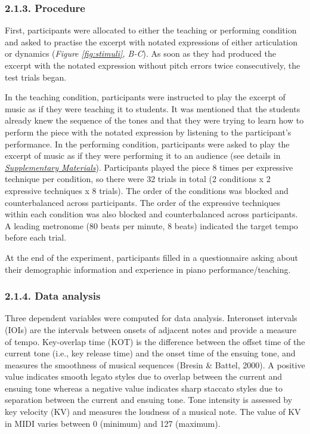 \documentclass[
  english,
  man,floatsintext]{apa6}
\begin{document}
\hypertarget{procedure}{%
\subsubsection{2.1.3. Procedure}\label{procedure}}

First, participants were allocated to either the teaching or performing condition and asked to practise the excerpt with notated expressions of either articulation or dynamics (\emph{Figure \ref{fig:stimuli}, B-C}). As soon as they had produced the excerpt with the notated expression without pitch errors twice consecutively, the test trials began.

In the teaching condition, participants were instructed to play the excerpt of music as if they were teaching it to students. It was mentioned that the students already knew the sequence of the tones and that they were trying to learn how to perform the piece with the notated expression by listening to the participant's performance. In the performing condition, participants were asked to play the excerpt of music as if they were performing it to an audience (see details in \emph{\protect\hyperlink{supplementary}{Supplementary Materials}}). Participants played the piece 8 times per expressive technique per condition, so there were 32 trials in total (2 conditions x 2 expressive techniques x 8 trials). The order of the conditions was blocked and counterbalanced across participants. The order of the expressive techniques within each condition was also blocked and counterbalanced across participants. A leading metronome (80 beats per minute, 8 beats) indicated the target tempo before each trial.

At the end of the experiment, participants filled in a questionnaire asking about their demographic information and experience in piano performance/teaching.

\hypertarget{data-analysis}{%
\subsubsection{2.1.4. Data analysis}\label{data-analysis}}

Three dependent variables were computed for data analysis. Interonset intervals (IOIs) are the intervals between onsets of adjacent notes and provide a measure of tempo. Key-overlap time (KOT) is the difference between the offset time of the current tone (i.e., key release time) and the onset time of the ensuing tone, and measures the smoothness of musical sequences (Bresin \& Battel, 2000). A positive value indicates smooth legato styles due to overlap between the current and ensuing tone whereas a negative value indicates sharp staccato styles due to separation between the current and ensuing tone. Tone intensity is assessed by key velocity (KV) and measures the loudness of a musical note. The value of KV in MIDI varies between 0 (minimum) and 127 (maximum).
\end{document}
